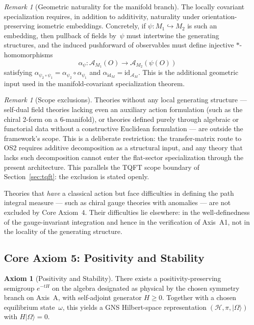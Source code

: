 \documentclass[12pt,a4paper]{article}
\theoremstyle{plain}
\theoremstyle{definition}
\newtheorem{axiom}[theorem]{Axiom}
\theoremstyle{remark}
\newtheorem{remark}[theorem]{Remark}
\newcommand{\hilb}{\mathcal{H}}
\newcommand{\alg}{\mathcal{A}}
\begin{document}
\begin{remark}[Geometric naturality for the manifold branch]
  \label{rem:naturality}
  The locally covariant specialization requires, in addition to
  additivity, naturality under orientation-preserving isometric
  embeddings. Concretely, if $\psi: M_1 \hookrightarrow M_2$ is such
  an embedding, then pullback of fields by~$\psi$ must intertwine the
  generating structures, and the induced pushforward of observables
  must define injective $*$-homomorphisms
  \[
    \alpha_\psi: \alg_{M_1}(O) \to \alg_{M_2}(\psi(O))
  \]
  satisfying $\alpha_{\psi_2 \circ \psi_1}
  = \alpha_{\psi_2}\circ \alpha_{\psi_1}$ and
  $\alpha_{\mathrm{id}_M} = \mathrm{id}_{\alg_M}$. This is the
  additional geometric input used in the manifold-covariant
  specialization theorem.
\end{remark}

\begin{remark}[Scope exclusions]\label{rem:action-scope}
  Theories without any local generating structure --- self-dual field
  theories lacking even an auxiliary action formulation (such as the
  chiral 2-form on a 6-manifold), or theories defined purely through
  algebraic or functorial data without a constructive Euclidean
  formulation --- are outside the framework's scope. This is a
  deliberate restriction: the transfer-matrix route to OS2 requires
  additive decomposition as a structural input, and any theory that
  lacks such decomposition cannot enter the flat-sector specialization
  through the present architecture. This parallels the TQFT scope
  boundary of Section~\ref{sec:tqft}: the exclusion is stated openly.

  Theories that \emph{have} a classical action but face difficulties
  in defining the path integral measure --- such as chiral gauge
  theories with anomalies --- are not excluded by Core Axiom~4. Their
  difficulties lie elsewhere: in the well-definedness of the
  gauge-invariant integration and hence in the verification of
  Axis~A1, not in the locality of the generating structure.
\end{remark}


\subsection{Core Axiom 5: Positivity and Stability}

\begin{axiom}[Positivity and Stability]\label{ax:positivity}
  There exists a positivity-preserving semigroup $e^{-tH}$ on the
  algebra designated as physical by the chosen symmetry branch on
  Axis~A, with self-adjoint generator $H \ge 0$. Together with a
  chosen equilibrium state~$\omega$, this yields a GNS Hilbert-space
  representation $(\hilb, \pi, |\Omega\rangle)$ with
  $H|\Omega\rangle = 0$.
\end{axiom}
\end{document}
